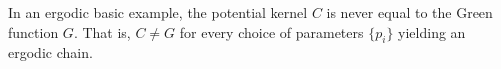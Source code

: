 In an ergodic basic example, the potential kernel $C$ is never equal to the Green function $G$. That is, $C \neq G$ for every choice of parameters $\{p_i\}$ yielding an ergodic chain.
